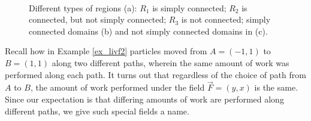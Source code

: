 \begin{figure}
\centering
\qquad
{}\\

\caption{Different types of regions (a): $R_1$ is simply connected; $R_2$ is connected, but not simply connected; $R_3$ is not connected; simply connected domains (b) and not simply connected domains in (c).}
\end{figure}

Recall how in Example \ref{ex_livf2} particles moved from $A = (-1,1)$ to $B = (1,1)$ along two different paths, wherein the same amount of work was performed along each path. It turns out that regardless of the choice of path from $A$ to $B$, the amount of work performed under the field $\vec F = \left( y, x\right)$ is the same. Since our expectation is that differing amounts of work are performed along different paths, we give such special fields a name. 

